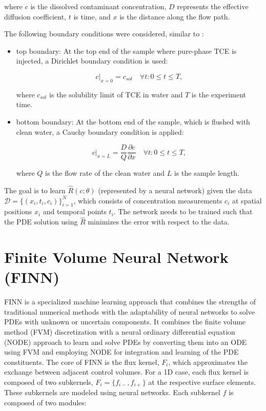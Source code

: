 where $c$ is the dissolved contaminant concentration, $D$ represents the effective diffusion coefficient, $t$ is time, and $x$ is the distance along the flow path.

The following boundary conditions were considered, similar to \textcite{nowak2016entropy}:

\begin{itemize}
    \item top boundary: At the top end of the sample where pure-phase TCE is injected, a Dirichlet boundary condition is used:

    \begin{equation}
        c|_{x=0} = c_{sol} \quad \forall t : 0 \leq t \leq T,
    \end{equation}

    where $c_{sol}$ is the solubility limit of TCE in water and $T$ is the experiment time.

    \item bottom boundary: At the bottom end of the sample, which is flushed with clean water, a Cauchy boundary condition is applied:

    \begin{equation}
        c|_{x=L} = \frac{D}{Q} \frac{\partial c}{\partial x} \quad \forall t : 0 \leq t \leq T,
    \end{equation}

    where $Q$ is the flow rate of the clean water and $L$ is the sample length.
\end{itemize}

The goal is to learn $\hat{R}(c;\theta)$ (represented by a neural network) given the data $\mathcal{D} = \{ (x_i, t_i, c_i) \}_{i=1}^N$, which consists of concentration measurements $c_i$ at spatial positions $x_i$ and temporal points $t_i$. The network needs to be trained such that the PDE solution using $\hat{R}$ minimizes the error with respect to the data.




\section{Finite Volume Neural Network (FINN)}
FINN \cite{finn} is a specialized machine learning approach that combines the strengths of traditional numerical methods with the adaptability of neural networks to solve PDEs with unknown or uncertain components. It combines the finite volume method (FVM) discretization with a neural ordinary differential equation (NODE) \cite{chen2019neuralordinarydifferentialequations} approach to learn and solve PDEs by converting them into an ODE using FVM and employing NODE for integration and learning of the PDE constituents. The core of FINN is the flux kernel, $F_i$, which approximates the exchange between adjacent control volumes. For a 1D case, each flux kernel is composed of two subkernels, $F_i = \{f_{i-}, f_{i+}\}$ at the respective surface elements. These subkernels are modeled using neural networks. Each subkernel $f$ is composed of two modules:

